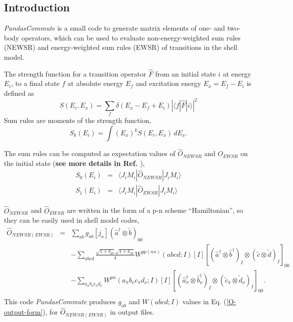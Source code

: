 \documentclass{article}
\begin{document}
\begin{spacing}{1.5}
\setlength{\abovedisplayskip}{1ex} 
\setlength{\belowdisplayskip}{1ex} 

\newcommand{\codetext}[1]{ \textcolor[rgb]{0.2,0.2,0.3}{\bf#1}}

\section{Introduction}
{\it PandasCommute} is a small code to generate matrix elements of one- and two-body operators, which can be used to evaluate non-energy-weighted sum rules (NEWSR) and energy-weighted sum rules (EWSR) of transitions in the shell model.

The strength function for a transition operator $\hat{F}$ from an initial state $i$ at energy $E_i$, to a final state $f$ at absolute energy $E_f$ and 
excitation energy $E_x = E_f - E_i$ is defined as
\begin{equation}
\label{strength}
S(E_i, E_x) = \sum_f \delta(E_x - E_f + E_i ) \left | \langle f  \left | \hat{F}  \right | i \rangle \right |^2
\end{equation}
Sum rules are moments of the strength function,
\begin{equation}
\label{sum_rules}
S_k(E_i) = \int \left ( E_x \right )^k S(E_i, E_x) \, dE_x.
\end{equation}

The sum rules can be computed as expectation values of $\hat{O}_{NEWSR}$ and $\hat{O}_{EWSR}$ on the initial state ({\bf see more details in Ref. \cite{arxiv}}),
\begin{eqnarray}
S_0(E_i) &=& 	\langle J_i M_i | \hat{O}_{NEWSR} | J_i M_i \rangle      \\
S_1(E_i) &=& 	\langle J_i M_i | \hat{O}_{EWSR} | J_i M_i \rangle      
\end{eqnarray}

$\hat{O}_{NEWSR}$ and $\hat{O}_{EWSR}$ are written in the form of a p-n scheme ``Hamiltonian'', so they can be easily used in shell model codes,
\begin{eqnarray}
\hat{O}_{NEWSR(EWSR)} &=& \sum_{ab} g_{ab} [j_a] (\hat{a}^\dagger \otimes \tilde{b})_{00}
		\nonumber\\
		&&- \sum_{abcd} \frac{ \sqrt{1+\delta_{ab}} \sqrt{1+\delta_{cd}} }{4}
W^{pp(nn)}(abcd;I) [I] \left[ (\hat{a}^\dagger \otimes \hat{b}^\dagger)_I \otimes (\tilde{c} \otimes \tilde{d})_I \right]_{00}
		\nonumber\\
		&&- \sum_{a_\pi b_\nu c_\pi d_\nu} W^{pn}(a_\pi b_\nu c_\pi d_\nu;I) [I] \left[ (\hat{a}^\dagger_\pi \otimes \hat{b}^\dagger_\nu)_I \otimes (\tilde{c}_\pi \otimes \tilde{d}_\nu)_I \right]_{00}.
\nonumber\\
\label{O-output-form}
\end{eqnarray}
This code {\it PandasCommute} produces $g_{ab}$ and $W(abcd;I)$ values in Eq. (\ref{O-output-form}), for $\hat{O}_{NEWSR(EWSR)}$ in output files.


\end{spacing}
\end{document}
